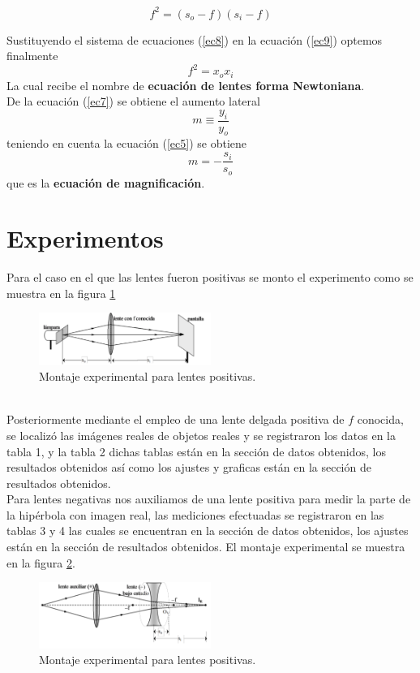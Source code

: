 \documentclass[13,twocolumn,letterpaper]{article}
\begin{document}
{{	\begin{equation}\label{ec9}
		f^{2}=(s_{o}-f)(s_{i}-f)
	\end{equation}
	
	Sustituyendo el sistema de ecuaciones (\ref{ec8}) en la ecuación (\ref{ec9}) optemos finalmente 
	\begin{equation}\label{ec10}
		f^{2}=x_{o}x_{i}
	\end{equation}
	La cual recibe el nombre de \textbf{ecuación de lentes forma Newtoniana}.\\
	De la ecuación (\ref{ec7}) se obtiene el aumento lateral 
	$$m\equiv\dfrac{y_{i}}{y_{o}}$$
	teniendo en cuenta la ecuación (\ref{ec5}) se obtiene 
	\begin{equation}\label{ec11}
		m=-\dfrac{s_{i}}{s_{o}}
	\end{equation}
	que es la \textbf{ecuación de magnificación}.
	}
}
\newpage
\onecolumn

\section*{Experimentos}
{
	Para el caso en el que las lentes fueron positivas se monto el experimento como se muestra en la figura \ref{fig:fig-3}
	\begin{figure}[!htb]
		\centering
		\includegraphics[width=0.5\textwidth]{./fig3}
		\caption[Fig 1]{\footnotesize{Montaje experimental para lentes positivas.}}
		\label{fig:fig-3}
	\end{figure}
	\\Posteriormente mediante el empleo de una lente delgada positiva de $f$ conocida, se localizó las imágenes reales de
	objetos reales y se registraron los datos en la tabla 1, y la tabla 2 dichas tablas están en la sección de datos obtenidos, los resultados obtenidos así como los ajustes y graficas están en la sección de resultados obtenidos.\\
	Para lentes negativas nos auxiliamos de una lente positiva para medir la parte de la hipérbola con imagen real, las mediciones efectuadas se registraron en las tablas 3 y 4  las cuales se encuentran en la sección de datos obtenidos, los ajustes están en la sección de resultados obtenidos. El montaje experimental se muestra en la figura \ref{fig:fig-4}.
	\begin{figure}[!htb]
		\centering
		\includegraphics[width=0.5\textwidth]{./fig4}
		\caption[Fig 1]{\footnotesize{Montaje experimental para lentes positivas.}}
		\label{fig:fig-4}
	\end{figure}
}
\end{document}

